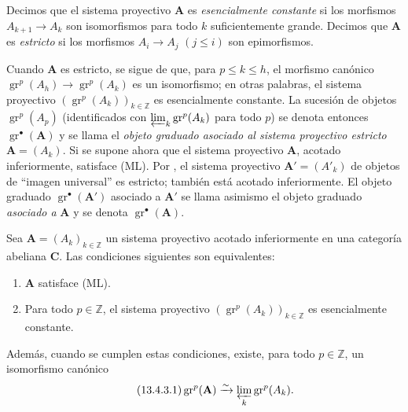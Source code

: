 \begin{env}[13.4.2]
\label{0.13.4.2}
\label{0.13.4.2-fr}
Decimos que el sistema proyectivo $\mathbf A$ es
\emph{esencialmente constante} si los morfismos
$A_{k+1}\to A_k$ son isomorfismos para todo $k$
suficientemente grande.
Decimos que $\mathbf A$ es \emph{estricto} si los morfismos
$A_i\to A_j$ $(j\leq i)$ son epimorfismos.

Cuando $\mathbf A$ es estricto, se sigue de  que, para
$p\leq k\leq h$, el morfismo canónico
$\operatorname{gr}^p(A_h)\to\operatorname{gr}^p(A_k)$
es un isomorfismo; en otras palabras, el sistema proyectivo
$(\operatorname{gr}^p(A_k))_{k\in\mathbb Z}$ es esencialmente constante.
La sucesión de objetos $\operatorname{gr}^p(A_p)$ (identificados con $\varprojlim_k\operatorname{gr}^p(A_k)$ para todo $p$) se denota entonces
$\operatorname{gr}^\bullet(\mathbf A)$ y se llama el
\emph{objeto graduado asociado al sistema proyectivo estricto}
$\mathbf A=(A_k)$. Si se supone ahora que el sistema proyectivo $\mathbf A$, acotado
inferiormente, satisface (ML).
Por , el sistema proyectivo
$\mathbf A'=(A'_k)$ de objetos de ``imagen universal'' es estricto; también está
acotado inferiormente.
El objeto graduado $\operatorname{gr}^\bullet(\mathbf A')$ asociado a
$\mathbf A'$ se llama asimismo el objeto graduado
\emph{asociado a} $\mathbf A$ y se denota
$\operatorname{gr}^\bullet(\mathbf A)$.
\end{env}

\begin{proposition}[13.4.3]
\label{0.13.4.3}
\label{0.13.4.3-fr}
Sea $\mathbf A=(A_k)_{k\in\mathbb Z}$ un sistema proyectivo acotado
inferiormente en una categoría abeliana $\boldsymbol{C}$.
Las condiciones siguientes son equivalentes:
\begin{enumerate}
  \item[{\rm a)}] $\mathbf A$ satisface \textup{(ML)}.
  \item[{\rm b)}] Para todo $p\in\mathbb Z$, el sistema proyectivo
  $(\operatorname{gr}^p(A_k))_{k\in\mathbb Z}$ es esencialmente constante.
\end{enumerate}
Además, cuando se cumplen estas condiciones, existe, para todo
$p\in\mathbb Z$, un isomorfismo canónico
\begin{equation}
\label{0.13.4.3.1-fr}
\tag{13.4.3.1}
\operatorname{gr}^p(\mathbf A)\xrightarrow{\sim}
\varprojlim_k\operatorname{gr}^p(A_k).
\end{equation}
\end{proposition}

